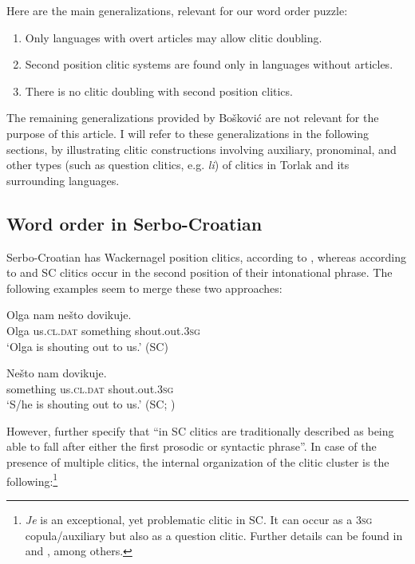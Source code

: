 \documentclass[output=paper,
colorlinks,
citecolor=brown,
newtxmath
]{langscibook}
\begin{document}
Here are the main generalizations, relevant for our word order puzzle:
\begin{enumerate}
\item Only languages with overt articles may allow clitic doubling.\label{gen:1}
\item Second position clitic systems are found only in languages without articles.\label{gen:2}
\item There is no clitic doubling with second position clitics.\label{gen:3}
\end{enumerate}

\noindent The remaining generalizations provided by Bošković are not relevant for the purpose of this article.
I will refer to these generalizations in the following sections, by illustrating clitic constructions involving auxiliary, pronominal, and other types (such as question clitics, e.g. \textit{li}) of clitics in Torlak and its surrounding languages.

\subsection{Word order in Serbo-Croatian}
\label{subsec:orderSC}
Serbo-Croatian has Wackernagel position clitics, according to \citet[217]{Franks.King2000}, whereas according to \citet{Boskovic2001} and \citet{Radanovic-Kocic1988,Radanovic-Kocic1996} SC clitics occur in the second position of their intonational phrase. The following examples seem to merge these two approaches:


\ea\label{ex:17}
\gll Olga nam        nešto     dovikuje.\\
     Olga us.\textsc{cl.dat}  something shout.out.\textsc{3sg}\\
\glt `Olga is shouting out to us.'
\hfill (SC)
\z


\ea\label{ex:18}
\gll Nešto     nam       dovikuje.\\
     something us.\textsc{cl.dat} shout.out.\textsc{3sg}\\
\glt `S/he is shouting out to us.'
\hfill (SC; \citealt[105]{Radanovic-Kocic1988})
\z

\noindent However, \citet[219]{Franks.King2000} further specify that ``in SC clitics are traditionally described as being able to fall after either the first prosodic or syntactic phrase''. In case of the presence of multiple clitics, the internal organization of the clitic cluster is the following:\footnote{\textit{Je} is an exceptional, yet problematic clitic in SC. It can occur as a \textsc{3sg} copula/auxiliary but also as a question clitic. Further details can be found in \citet{Franks2017} and \citet{Zivojinovicinpreparation}, among others.}
\end{document}
